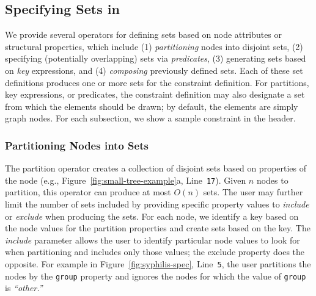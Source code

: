 \subsection{Specifying Sets in \projectname}
We provide several operators for defining sets based on node attributes 
or structural properties, which include (1) \emph{partitioning} nodes 
into disjoint sets, (2) specifying (potentially overlapping) sets via
\emph{predicates}, (3) generating sets based on \emph{key} expressions,
and (4) \emph{composing} previously defined sets. Each of these set
definitions produces one or more sets for the constraint definition. For
partitions, key expressions, or predicates, the constraint definition may also 
designate a set from which the elements should be drawn; by default, the
elements are simply graph nodes. For each subsection, we show a sample
\projectname constraint in the header.

\subsubsection{Partitioning Nodes into Sets}
The partition operator creates a collection of disjoint sets based on
properties of the node
(e.g., Figure~\ref{fig:small-tree-example}a, Line~\texttt{17}).
Given $n$ nodes to partition, this operator can produce at most $O(n)$ 
sets. The user may further limit 
the number of sets included by providing specific property values to 
\emph{include} or \emph{exclude} when producing the sets.
For each node, we identify a key based on the node values for the partition
properties and create sets based on the key. The \emph{include} parameter allows
the user to identify particular node values to look for when partitioning
and includes only those values; the exclude property does the opposite. 
For example in Figure~\ref{fig:syphilis-spec}, Line~\texttt{5}, the user
partitions the nodes by the \texttt{group} property and ignores the nodes
for which the value of \texttt{group} is \emph{``other.''}

